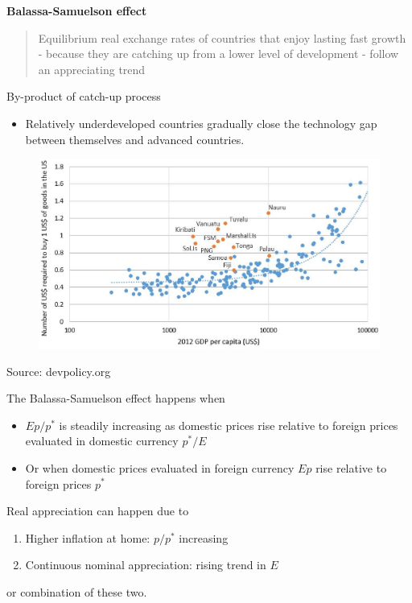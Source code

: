 \documentclass{beamer}
\begin{document}
\begin{frame}
  \textbf{Balassa-Samuelson effect}
  \begin{quote}
    Equilibrium real exchange rates of countries that enjoy lasting fast growth - because they are catching up from a lower level of development - follow an appreciating trend
  \end{quote}
  \medskip
  By-product of catch-up process 
  \begin{itemize}
    \item Relatively underdeveloped countries gradually close the technology gap between themselves and advanced countries.
  \end{itemize}  
\end{frame}

\begin{frame}
  \begin{figure}
    \includegraphics[scale=.5]{expensive_pacific.eps}
  \end{figure}
  Source: devpolicy.org
\end{frame}

\begin{frame}
  The Balassa-Samuelson effect happens when
 \begin{itemize}
    \item $Ep/p^*$ is steadily increasing as domestic prices rise relative to foreign prices evaluated in domestic currency $p^*/E$
    \item Or when domestic prices evaluated in foreign currency $Ep$ rise relative to foreign prices $p^*$
  \end{itemize}
  \medskip
  Real appreciation can happen due to
  \begin{enumerate}
    \item Higher inflation at home: $p / p^*$ increasing
    \item Continuous nominal appreciation: rising trend in $E$
  \end{enumerate}
  or combination of these two.
\end{frame}

\end{document}
